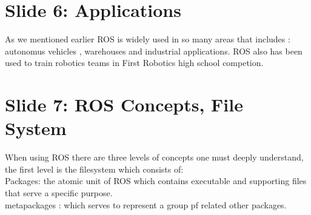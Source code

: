 \documentclass[
12pt,draftcls,onecolumn%
]{IEEEtran}
\begin{document}
\section{Slide 6: Applications}
As we mentioned earlier ROS is widely used in so many areas that includes : autonomus vehicles , warehouses and industrial applications. ROS also has been used to train robotics teams in First Robotics high school competion.
\section{Slide 7: ROS Concepts, File System }
When using ROS there are three levels of concepts one must deeply understand, the first level is the filesystem which consists of:
\\Packages: the atomic unit of ROS which contains executable and supporting files that serve a specific purpose. 
\\metapackages : which serves to represent a group pf related other packages.  
\end{document}
